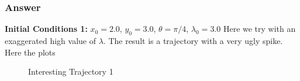 \documentclass[10pt,a4paper]{article}
\begin{document}
\subsubsection*{Answer}

\textbf{Initial Conditions 1:} $x_{0} = 2.0$, $y_{0} = 3.0$, $\theta = \pi / 4 $, $\lambda_{0} = 3.0$
Here we try with an exaggerated high value of $\lambda$. The result is a trajectory with a very ugly spike. Here the plots
	\begin{figure}[h]
			\centering
            \caption{ Interesting Trajectory 1 }
            \label{fig:Q2b1}
	\end{figure}
\end{document}
